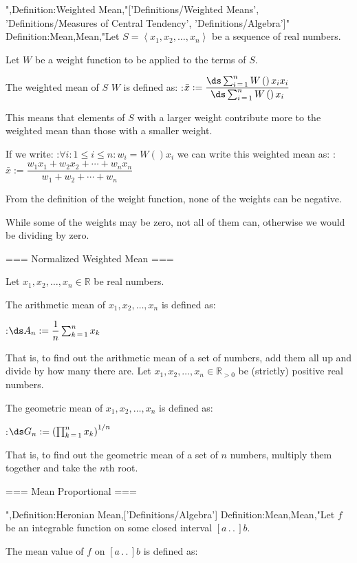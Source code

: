 ",Definition:Weighted Mean,"['Definitions/Weighted Means', 'Definitions/Measures of Central Tendency', 'Definitions/Algebra']"
Definition:Mean,Mean,"Let $S = \left\langle x_1, x_2, \ldots, x_n \right\rangle$ be a sequence of real numbers.

Let $W$ be a weight function to be applied to the terms of $S$.


The weighted mean of $S$  $W$ is defined as:
:$\bar x := \dfrac {\ds \sum_{i \mathop = 1}^n W \left(   \right){x_i} x_i} {\ds \sum_{i \mathop = 1}^n W \left(   \right){x_i} }$

This means that elements of $S$ with a larger weight contribute more to the weighted mean than those with a smaller weight.


If we write:
:$\forall i: 1 \le i \le n: w_i = W \left(   \right){x_i}$
we can write this weighted mean as:
:$\bar x := \dfrac {w_1 x_1 + w_2 x_2 + \cdots + w_n x_n} {w_1 + w_2 + \cdots + w_n}$


From the definition of the weight function, none of the weights can be negative.

While some of the weights may be zero, not all of them can, otherwise we would be dividing by zero.


=== Normalized Weighted Mean ===

Let $x_1, x_2, \ldots, x_n \in \mathbb R$ be real numbers.

The arithmetic mean of $x_1, x_2, \ldots, x_n$ is defined as:

:$\ds A_n := \dfrac 1 n \sum_{k \mathop = 1}^n x_k$

That is, to find out the arithmetic mean of a set of numbers, add them all up and divide by how many there are.
Let $x_1, x_2, \ldots, x_n \in \mathbb R_{>0}$ be (strictly) positive real numbers.

The geometric mean of $x_1, x_2, \ldots, x_n$ is defined as:

:$\ds G_n := \left( \prod_{k \mathop = 1}^n x_k \right)^{1/n}$


That is, to find out the geometric mean of a set of $n$ numbers, multiply them together and take the $n$th root.


=== Mean Proportional ===

",Definition:Heronian Mean,['Definitions/Algebra']
Definition:Mean,Mean,"Let $f$ be an integrable function on some closed interval $\left[ a \,.\,.\,   \right]b$.

The mean value of $f$ on $\left[ a \,.\,.\,   \right]b$ is defined as:

